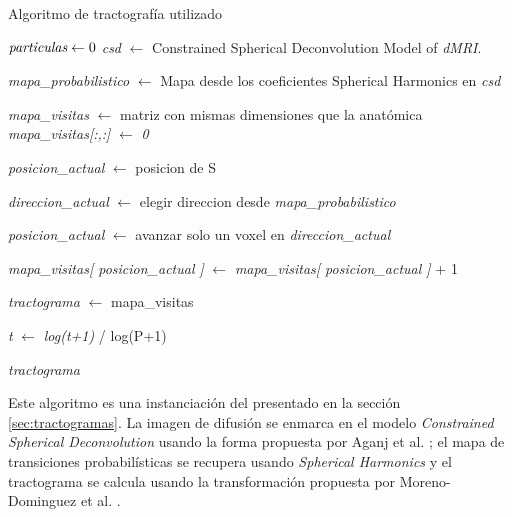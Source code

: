 \begin{algorithm}
\caption{Algoritmo de tractograf\'ia utilizado}\label{alg:localtracking}
\begin{algorithmic}[1]


\State $\emph{particulas} \gets 0 $
\State \emph{csd} $\gets$ Constrained Spherical Deconvolution Model of \emph{dMRI}. 

\State \emph{mapa\_probabilistico} $\gets$ Mapa desde los coeficientes
                                           Spherical Harmonics en \emph{csd}

\State \emph{mapa\_visitas} $\gets$ matriz con mismas dimensiones que la anat\'omica
\State \emph{mapa\_visitas[:,:]} $\gets$ \emph{0} 


    \State \emph{posicion\_actual} $\gets$ posicion de S
    

        \State \emph{direccion\_actual} $\gets$ elegir direccion desde \emph{mapa\_probabilistico} 
        
        \State \emph{posicion\_actual} $\gets$ avanzar solo un voxel en \emph{direccion\_actual} 
        
        \State \emph{mapa\_visitas[ posicion\_actual ]} $\gets$ \emph{mapa\_visitas[ posicion\_actual ]} + 1
    
    \EndWhile
\EndWhile

\State \emph{tractograma} $\gets$ mapa\_visitas 

    \State \emph{t} $\gets$ \emph{log(t+1)} / log(P+1)

\EndFor

\State \Return \emph{tractograma} 
 
\EndProcedure
\end{algorithmic}

\end{algorithm}

Este algoritmo es una instanciaci\'on del presentado en la secci\'on 
\ref{sec:tractogramas}. La imagen de difusi\'on se enmarca en el modelo
\textit{Constrained Spherical Deconvolution} usando la forma propuesta por 
Aganj et al. \cite{Aganj2010}; el mapa de transiciones probabil\'isticas
se recupera usando \textit{Spherical Harmonics} \cite{Descoteaux2007} y el 
tractograma se calcula usando la transformaci\'on propuesta por
Moreno-Dominguez et al. \cite{Moreno-Dominguez2014}. \\


